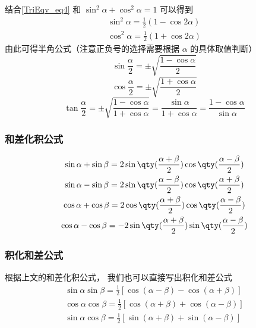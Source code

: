 结合\autoref{TriEqv_eq4} 和 $\sin^2 \alpha + \cos^2 \alpha = 1$ 可以得到
\begin{gather}
\sin^2 \alpha = \frac12 (1- \cos 2\alpha) \label{TriEqv_eq5} \\
\cos^2 \alpha = \frac12 (1+\cos 2\alpha) \label{TriEqv_eq6}
\end{gather}
由此可得半角公式（注意正负号的选择需要根据 $\alpha$ 的具体取值判断）
\begin{equation}
\sin\frac{ \alpha}{2} = \pm\sqrt{\frac{1-\cos \alpha}{2}}
\end{equation}
\begin{equation}
\cos\frac{ \alpha}{2}= \pm\sqrt{\frac{1+\cos \alpha}{2}}
\end{equation}
\begin{equation}
\tan\frac{ \alpha}{2} = \pm\sqrt{\frac{1-\cos \alpha}{1+\cos \alpha}} = \frac{\sin \alpha}{1+\cos \alpha} = \frac{1-\cos \alpha}{\sin \alpha}
\end{equation}

\subsubsection{和差化积公式}
\begin{gather}
\sin \alpha + \sin \beta = 2\sin\qty(\frac{\alpha + \beta}{2})\cos\qty(\frac{\alpha - \beta}{2})\label{TriEqv_eq7}\\
\sin \alpha - \sin \beta = 2\sin\qty(\frac{\alpha - \beta}{2})\cos\qty(\frac{\alpha + \beta}{2})\label{TriEqv_eq8}\\
\cos \alpha + \cos \beta = 2\cos\qty(\frac{\alpha+\beta}{2})\cos\qty(\frac{\alpha-\beta}{2})\label{TriEqv_eq9}\\
\cos \alpha - \cos \beta = -2\sin\qty(\frac{\alpha+\beta}{2})\sin\qty(\frac{\alpha-\beta}{2})\label{TriEqv_eq10}
\end{gather}

\subsubsection{积化和差公式}
根据上文的和差化积公式， 我们也可以直接写出积化和差公式
\begin{gather}
\label{TriEqv_eq11}
\sin \alpha\sin \beta = \frac12 [\cos(\alpha - \beta) - \cos(\alpha + \beta)]\\
\label{TriEqv_eq12}
\cos \alpha\cos \beta = \frac12 [\cos(\alpha + \beta) + \cos(\alpha - \beta)]\\
\label{TriEqv_eq14}
\sin \alpha\cos \beta = \frac12 [\sin(\alpha + \beta) + \sin(\alpha - \beta)]
\end{gather}

